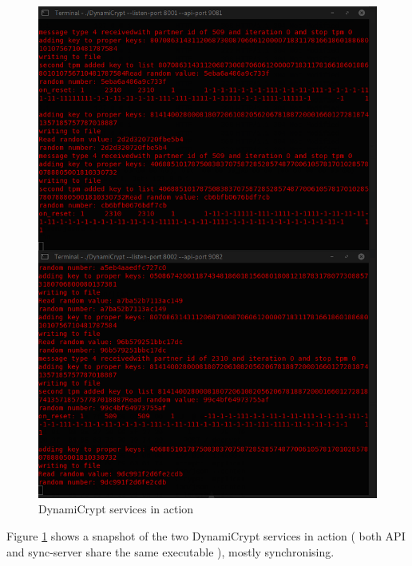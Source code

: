 \begin{figure}[!h]
  \centering
      \includegraphics[width=1\textwidth]{Figures/proto3-final.png}
  \caption[DynamiCrypt services in action]{DynamiCrypt services in action}
  \label{fig:proto3-final}
\end{figure}
\FloatBarrier

Figure \ref{fig:proto3-final} shows a snapshot of the two DynamiCrypt services in action ( both API and sync-server share the same executable ), mostly synchronising.


